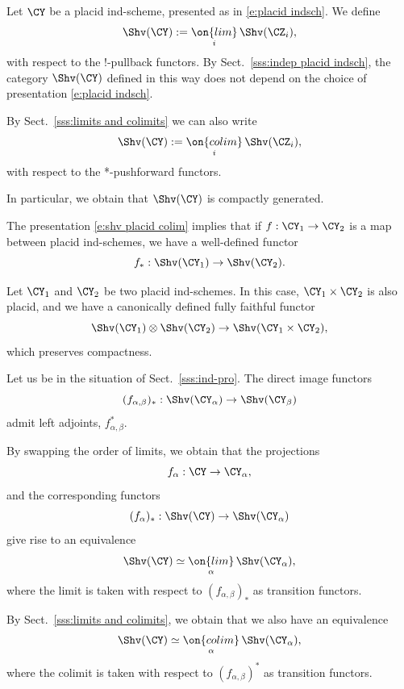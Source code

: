 \documentclass[9pt]{amsart}
\theoremstyle{definition}
\theoremstyle{remark}
\newcommand{\secref}[1]{Sect.~\ref{#1}}
\numberwithin{equation}{section}
\begin{document}
\sssec{}

Let $\CY$ be a placid ind-scheme, presented as in \eqref{e:placid indsch}. We define
$$\Shv(\CY):=\underset{i}{\on{lim}}\, \Shv(\CZ_i),$$
with respect to the !-pullback functors. By \secref{sss:indep placid indsch}, the category $\Shv(\CY)$
defined in this way does not depend on the choice of presentation \eqref{e:placid indsch}.

\medskip

By \secref{sss:limits and colimits} we can also write
\begin{equation} \label{e:shv placid colim}
\Shv(\CY):=\underset{i}{\on{colim}}\, \Shv(\CZ_i),
\end{equation} 
with respect to the *-pushforward functors. 

\medskip

In particular, we obtain that $\Shv(\CY)$ is compactly generated. 

\sssec{}  \label{sss:functoriality of shv on placid indsch}

The presentation \eqref{e:shv placid colim} implies that if $f:\CY_1\to \CY_2$ is a map between placid ind-schemes,
we have a well-defined functor
$$f_*:\Shv(\CY_1)\to \Shv(\CY_2).$$

\sssec{}  \label{sss:prod placid}

Let $\CY_1$ and $\CY_2$ be two placid ind-schemes. In this case, $\CY_1\times \CY_2$ is also 
placid, and we have a canonically defined fully faithful functor
$$\Shv(\CY_1)\otimes \Shv(\CY_2)\to \Shv(\CY_1\times \CY_2),$$
which preserves compactness. 

\sssec{}  \label{sss:sheaves on ind-pro}

Let us be in the situation of \secref{sss:ind-pro}. The direct image functors
$$(f_{\alpha,\beta})_*:\Shv(\CY_\alpha)\to \Shv(\CY_\beta)$$
admit left adjoints, $f_{\alpha,\beta}^*$.

\medskip

By swapping the order of limits, we obtain that the projections
$$f_\alpha:\CY\to \CY_\alpha,$$
and the corresponding functors
$$(f_\alpha)_*:\Shv(\CY)\to \Shv(\CY_\alpha)$$
give rise to an equivalence
$$\Shv(\CY) \simeq \underset{\alpha}{\on{lim}}\, \Shv(\CY_\alpha),$$
where the limit is taken with respect to $(f_{\alpha,\beta})_*$ as transition functors. 

\medskip

By \secref{sss:limits and colimits}, we obtain that we also have an equivalence
$$\Shv(\CY) \simeq \underset{\alpha}{\on{colim}}\, \Shv(\CY_\alpha),$$
where the colimit is taken with respect to $(f_{\alpha,\beta})^*$ as transition functors. 
\end{document}
